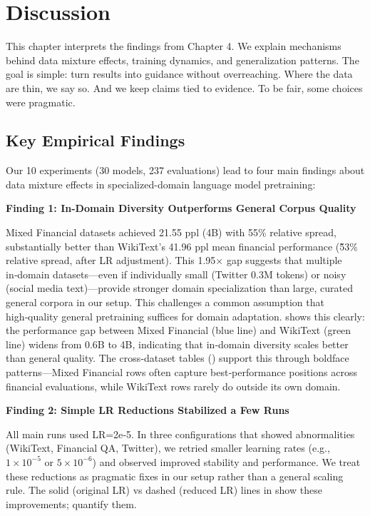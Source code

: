 \chapter{Discussion}

This chapter interprets the findings from Chapter 4. We explain mechanisms behind data mixture effects, training dynamics, and generalization patterns. The goal is simple: turn results into guidance without overreaching. Where the data are thin, we say so. And we keep claims tied to evidence. To be fair, some choices were pragmatic.

\section{Key Empirical Findings}

Our 10 experiments (30 models, 237 evaluations) lead to four main findings about data mixture effects in specialized-domain language model pretraining:

\textbf{Finding 1: In-Domain Diversity Outperforms General Corpus Quality}

Mixed Financial datasets achieved 21.55 ppl (4B) with 55\% relative spread, substantially better than WikiText's 41.96 ppl mean financial performance (\~53\% relative spread, after LR adjustment). This 1.95$\times$ gap suggests that multiple in‑domain datasets—even if individually small (Twitter 0.3M tokens) or noisy (social media text)—provide stronger domain specialization than large, curated general corpora in our setup. This challenges a common assumption that high‑quality general pretraining suffices for domain adaptation.  shows this clearly: the performance gap between Mixed Financial (blue line) and WikiText (green line) widens from 0.6B to 4B, indicating that in‑domain diversity scales better than general quality. The cross‑dataset tables () support this through boldface patterns—Mixed Financial rows often capture best‑performance positions across financial evaluations, while WikiText rows rarely do outside its own domain.

\textbf{Finding 2: Simple LR Reductions Stabilized a Few Runs}

All main runs used LR=2e‑5. In three configurations that showed abnormalities (WikiText, Financial QA, Twitter), we retried smaller learning rates (e.g., $1\times10^{-5}$ or $5\times10^{-6}$) and observed improved stability and performance. We treat these reductions as pragmatic fixes in our setup rather than a general scaling rule. The solid (original LR) vs dashed (reduced LR) lines in  show these improvements;  quantify them.

